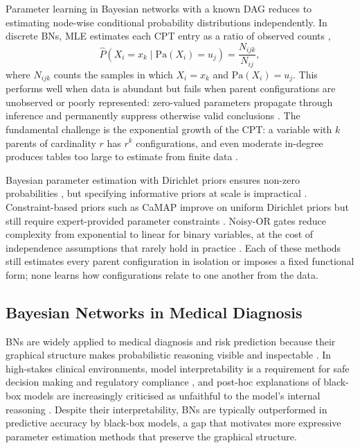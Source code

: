\documentclass[a4paper,fleqn]{cas-dc}
\newcommand{\Pa}{\mathrm{Pa}}
\begin{document}
Parameter learning in Bayesian networks with a known DAG reduces to estimating node-wise conditional probability distributions independently. In discrete BNs, MLE estimates each CPT entry as a ratio of observed counts \citep[Sec.~17.2]{koller2009probabilistic},
\begin{equation}
\hat{P}(X_i = x_k \mid \Pa(X_i)=u_j)=\frac{N_{ijk}}{N_{ij}},
\label{eq:mle}
\end{equation}
where $N_{ijk}$ counts the samples in which $X_i=x_k$ and $\Pa(X_i)=u_j$. This performs well when data is abundant but fails when parent configurations are unobserved or poorly represented: zero-valued parameters propagate through inference and permanently suppress otherwise valid conclusions \citep{impact_oniko_2013}. The fundamental challenge is the exponential growth of the CPT: a variable with $k$ parents of cardinality $r$ has $r^k$ configurations, and even moderate in-degree produces tables too large to estimate from finite data \citep[Sec.~5.2]{learning_oniko_2001,koller2009probabilistic}.

Bayesian parameter estimation with Dirichlet priors ensures non-zero probabilities \citep[Secs.~17.3--17.4]{koller2009probabilistic}, but specifying informative priors at scale is impractical \citep{comprehensive_kyrimi_2021}. Constraint-based priors such as CaMAP improve on uniform Dirichlet priors but still require expert-provided parameter constraints \citep{constrained_di_2021}. Noisy-OR gates reduce complexity from exponential to linear for binary variables, at the cost of independence assumptions that rarely hold in practice \citep{learning_oniko_2001}. Each of these methods still estimates every parent configuration in isolation or imposes a fixed functional form; none learns how configurations relate to one another from the data.

\subsection{Bayesian Networks in Medical Diagnosis}

BNs are widely applied to medical diagnosis and risk prediction because their graphical structure makes probabilistic reasoning visible and inspectable \citep{comprehensive_kyrimi_2021,zhong2024predicting,bayesian_polotskaya_2024}. In high-stakes clinical environments, model interpretability is a requirement for safe decision making and regulatory compliance \citep{explainable_hulsen_2023}, and post-hoc explanations of black-box models are increasingly criticised as unfaithful to the model's internal reasoning \citep{stop_rudin_2019}. Despite their interpretability, BNs are typically outperformed in predictive accuracy by black-box models, a gap that motivates more expressive parameter estimation methods that preserve the graphical structure.
\end{document}
